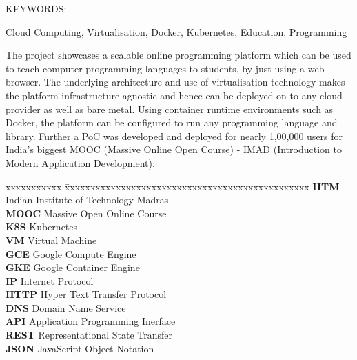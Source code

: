\documentclass[DD]{iitmdiss}
\begin{document}




\abstract

\noindent KEYWORDS: \hspace*{0.5em} \parbox[t]{4.4in}{Cloud Computing, Virtualisation, Docker, Kubernetes, Education, Programming}

\vspace*{24pt}

\noindent The project showcases a scalable online programming platform which can be used to teach computer programming languages to students, by just using a web browser. The underlying architecture and use of virtualisation technology makes the platform infrastructure agnostic and hence can be deployed on to any cloud provider as well as bare metal. Using container runtime environments such as Docker, the platform can be configured to run any programming language and library. Further a PoC was developed and deployed for nearly 1,00,000 users for India's biggest MOOC (Massive Online Open Course) - IMAD (Introduction to Modern Application Development).

\pagebreak


\begin{singlespace}
\tableofcontents
\thispagestyle{empty}

\listoftables
{}
\listoffigures
{}
\end{singlespace}


\abbreviations

\noindent 
\begin{tabbing}
xxxxxxxxxxx \= xxxxxxxxxxxxxxxxxxxxxxxxxxxxxxxxxxxxxxxxxxxxxxxx \kill
\textbf{IITM}   \> Indian Institute of Technology Madras \\
\textbf{MOOC} \> Massive Open Online Course \\
\textbf{K8S} \> Kubernetes \\
\textbf{VM} \> Virtual Machine \\
\textbf{GCE} \> Google Compute Engine \\
\textbf{GKE} \> Google Container Engine \\
\textbf{IP} \> Internet Protocol \\
\textbf{HTTP} \> Hyper Text Transfer Protocol \\
\textbf{DNS} \> Domain Name Service \\
\textbf{API} \> Application Programming Inerface \\
\textbf{REST} \> Representational State Transfer \\
\textbf{JSON} \> JavaScript Object Notation \\
\end{tabbing}
\end{document}
